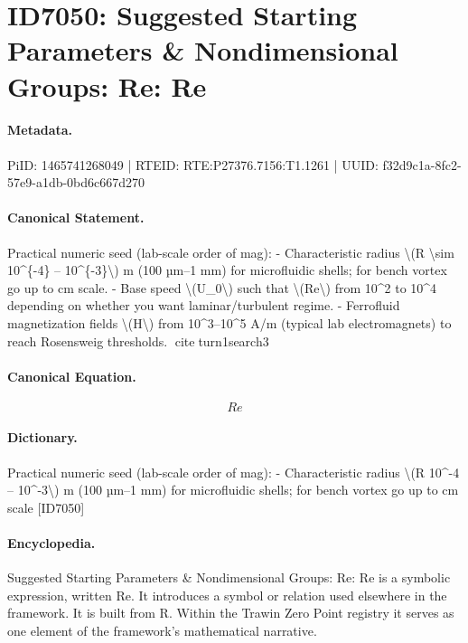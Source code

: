 \section*{ID7050: Suggested Starting Parameters \& Nondimensional Groups: Re: Re}
\paragraph{Metadata.}
PiID: 1465741268049 | RTEID: RTE:P27376.7156:T1.1261 | UUID: f32d9c1a-8fc2-57e9-a1db-0bd6c667d270

\paragraph{Canonical Statement.}
Practical numeric seed (lab-scale order of mag): - Characteristic radius \textbackslash{}(R \textbackslash{}sim 10\textasciicircum{}\{-4\} – 10\textasciicircum{}\{-3\}\textbackslash{}) m (100 µm–1 mm) for microfluidic shells; for bench vortex go up to cm scale. - Base speed \textbackslash{}(U\_0\textbackslash{}) such that \textbackslash{}(Re\textbackslash{}) from 10\textasciicircum{}2 to 10\textasciicircum{}4 depending on whether you want laminar/turbulent regime. - Ferrofluid magnetization fields \textbackslash{}(H\textbackslash{}) from 10\textasciicircum{}3–10\textasciicircum{}5 A/m (typical lab electromagnets) to reach Rosensweig thresholds. citeturn1search3

\paragraph{Canonical Equation.}
\[
Re
\]

\paragraph{Dictionary.}
Practical numeric seed (lab-scale order of mag): - Characteristic radius \textbackslash{}(R 10\textasciicircum{}-4 – 10\textasciicircum{}-3\textbackslash{}) m (100 µm–1 mm) for microfluidic shells; for bench vortex go up to cm scale [ID7050]

\paragraph{Encyclopedia.}
Suggested Starting Parameters \& Nondimensional Groups: Re: Re is a symbolic expression, written Re. It introduces a symbol or relation used elsewhere in the framework. It is built from R. Within the Trawin Zero Point registry it serves as one element of the framework's mathematical narrative.
